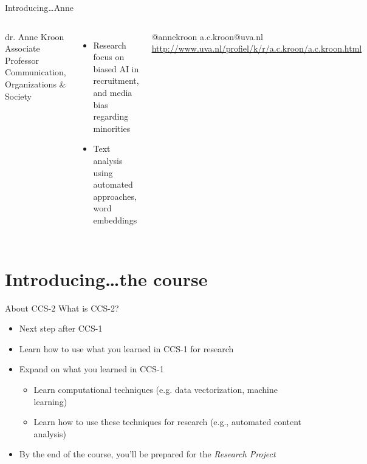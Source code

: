 \documentclass[handout]{beamer}
\begin{document}
\begin{frame}{Introducing\ldots \huge{Anne}} 
	\begin{columns}[]    dr. Anne Kroon \\ 
		Associate Professor Communication, Organizations \& Society
		\begin{itemize} 
			\item Research focus on biased AI in recruitment, and media bias regarding minorities
			\item Text analysis using automated approaches, word embeddings
		\end{itemize} @annekroon \textbar a.c.kroon@uva.nl  \textbar \\ \url{http://www.uva.nl/profiel/k/r/a.c.kroon/a.c.kroon.html} 
	\end{columns} 
\end{frame}

\section[The course]{Introducing\ldots the course}

\begin{frame}{About CCS-2} 
What is CCS-2?
	\begin{itemize}
		\item Next step after CCS-1 
		\item Learn how to use what you learned in CCS-1 for research
		\item Expand on what you learned in CCS-1
		\begin{itemize}
			\item Learn computational techniques (e.g. data vectorization, machine learning)
			\item Learn how to use these techniques for research (e.g., automated content analysis)
		\end{itemize}
		\item By the end of the course, you'll be prepared for the \emph{Research Project}
	\end{itemize}
	
\end{frame}
\end{document}
